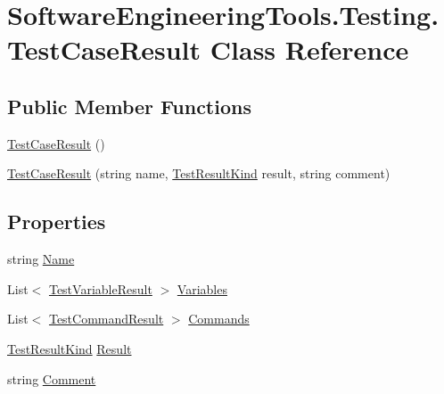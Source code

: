 \hypertarget{class_software_engineering_tools_1_1_testing_1_1_test_case_result}{\section{Software\+Engineering\+Tools.\+Testing.\+Test\+Case\+Result Class Reference}
\label{class_software_engineering_tools_1_1_testing_1_1_test_case_result}
}
\subsection*{Public Member Functions}
\begin{DoxyCompactItemize}
\item 
\hyperlink{class_software_engineering_tools_1_1_testing_1_1_test_case_result_ae433a27ea52af7becce61bb408439672}{Test\+Case\+Result} ()
\item 
\hyperlink{class_software_engineering_tools_1_1_testing_1_1_test_case_result_a567607ee6ddc2722c8853553b5c14cf2}{Test\+Case\+Result} (string name, \hyperlink{namespace_software_engineering_tools_1_1_testing_a8aff450bdbdae45d2f8a72713e102ba2}{Test\+Result\+Kind} result, string comment)
\end{DoxyCompactItemize}
\subsection*{Properties}
\begin{DoxyCompactItemize}
\item 
string \hyperlink{class_software_engineering_tools_1_1_testing_1_1_test_case_result_a45cc74e60da35652a786c1f53cacff7a}{Name}
\item 
List$<$ \hyperlink{class_software_engineering_tools_1_1_testing_1_1_test_variable_result}{Test\+Variable\+Result} $>$ \hyperlink{class_software_engineering_tools_1_1_testing_1_1_test_case_result_ab0c2ca15dc89f3d4ff0ade1087cb6d61}{Variables}
\item 
List$<$ \hyperlink{class_software_engineering_tools_1_1_testing_1_1_test_command_result}{Test\+Command\+Result} $>$ \hyperlink{class_software_engineering_tools_1_1_testing_1_1_test_case_result_a234642830cddb778e4cbff58c11c4b37}{Commands}
\item 
\hyperlink{namespace_software_engineering_tools_1_1_testing_a8aff450bdbdae45d2f8a72713e102ba2}{Test\+Result\+Kind} \hyperlink{class_software_engineering_tools_1_1_testing_1_1_test_case_result_a69e1a0107ef4fe18d2f9adab43cb18e1}{Result}
\item 
string \hyperlink{class_software_engineering_tools_1_1_testing_1_1_test_case_result_a46e72de12e8afe5255484cdfcd3849b0}{Comment}
\end{DoxyCompactItemize}


